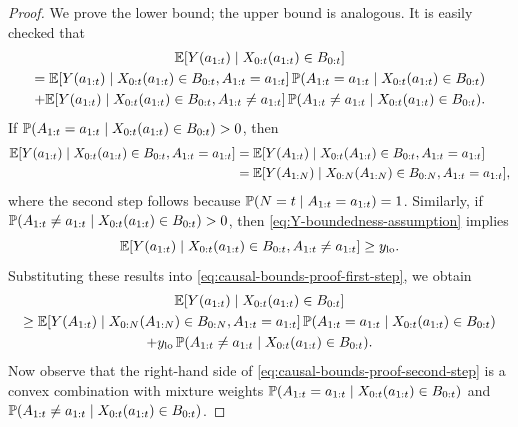 \begin{proof}
We prove the lower bound; the upper bound is analogous.
It is easily checked that 
\begin{multline} \label{eq:causal-bounds-proof-first-step}
    \mathbb{E}[Y(a_{1:t}) \mid X_{0:t}(a_{1:t}) \in B_{0:t}] \\
        = \mathbb{E}[Y(a_{1:t}) \mid X_{0:t}(a_{1:t}) \in B_{0:t}, A_{1:t} = a_{1:t}] \, \mathbb{P}(A_{1:t} = a_{1:t} \mid X_{0:t}(a_{1:t}) \in B_{0:t}) \\
            + \mathbb{E}[Y(a_{1:t}) \mid X_{0:t}(a_{1:t}) \in B_{0:t}, A_{1:t} \neq a_{1:t}] \, \mathbb{P}(A_{1:t} \neq a_{1:t} \mid X_{0:t}(a_{1:t}) \in B_{0:t}).
\end{multline}
If $\mathbb{P}(A_{1:t} = a_{1:t} \mid X_{0:t}(a_{1:t}) \in B_{0:t}) > 0$, then
\begin{align*}
    \mathbb{E}[Y(a_{1:t}) \mid X_{0:t}(a_{1:t}) \in B_{0:t}, A_{1:t} = a_{1:t}]
        &= \mathbb{E}[Y(A_{1:t}) \mid X_{0:t}(A_{1:t}) \in B_{0:t}, A_{1:t} = a_{1:t}] \\
        &= \mathbb{E}[Y(A_{1:N}) \mid X_{0:N}(A_{1:N}) \in B_{0:N}, A_{1:t} = a_{1:t}],
\end{align*}
where the second step follows because $\mathbb{P}(N = t \mid A_{1:t} = a_{1:t}) = 1$.
Similarly, if $\mathbb{P}(A_{1:t} \neq a_{1:t} \mid X_{0:t}(a_{1:t}) \in B_{0:t}) > 0$, then \eqref{eq:Y-boundedness-assumption} implies
\[
    \mathbb{E}[Y(a_{1:t}) \mid X_{0:t}(a_{1:t}) \in B_{0:t}, A_{1:t} \neq a_{1:t}]
        \geq y_{\mathrm{lo}}.
\]
Substituting these results into \eqref{eq:causal-bounds-proof-first-step}, we obtain
\begin{multline} \label{eq:causal-bounds-proof-second-step}
    \mathbb{E}[Y(a_{1:t}) \mid X_{0:t}(a_{1:t}) \in B_{0:t}] \\
    \geq \mathbb{E}[Y(A_{1:t}) \mid X_{0:N}(A_{1:N}) \in B_{0:N}, A_{1:t} = a_{1:t}] \, \mathbb{P}(A_{1:t} = a_{1:t} \mid X_{0:t}(a_{1:t}) \in B_{0:t}) \\
            + y_{\mathrm{lo}} \, \mathbb{P}(A_{1:t} \neq a_{1:t} \mid X_{0:t}(a_{1:t}) \in B_{0:t}).
\end{multline}
Now observe that the right-hand side of \eqref{eq:causal-bounds-proof-second-step} is a convex combination with mixture weights $\mathbb{P}(A_{1:t} = a_{1:t} \mid X_{0:t}(a_{1:t}) \in B_{0:t})$ and $\mathbb{P}(A_{1:t} \neq a_{1:t} \mid X_{0:t}(a_{1:t}) \in B_{0:t})$.

\end{proof}
